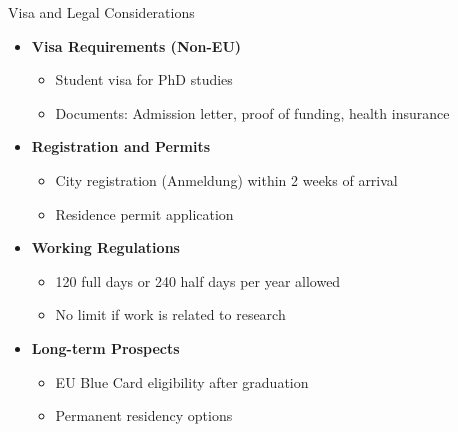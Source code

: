 \documentclass[aspectratio=169,10pt]{beamer}
\begin{document}
\begin{frame}{Visa and Legal Considerations}
\begin{itemize}
    \item \textbf{Visa Requirements (Non-EU)}
    \begin{itemize}
        \item Student visa for PhD studies
        \item Documents: Admission letter, proof of funding, health insurance
    \end{itemize}
    \item \textbf{Registration and Permits}
    \begin{itemize}
        \item City registration (Anmeldung) within 2 weeks of arrival
        \item Residence permit application
    \end{itemize}
    \item \textbf{Working Regulations}
    \begin{itemize}
        \item 120 full days or 240 half days per year allowed
        \item No limit if work is related to research
    \end{itemize}
    \item \textbf{Long-term Prospects}
    \begin{itemize}
        \item EU Blue Card eligibility after graduation
        \item Permanent residency options
    \end{itemize}
\end{itemize}
\end{frame}
\end{document}
